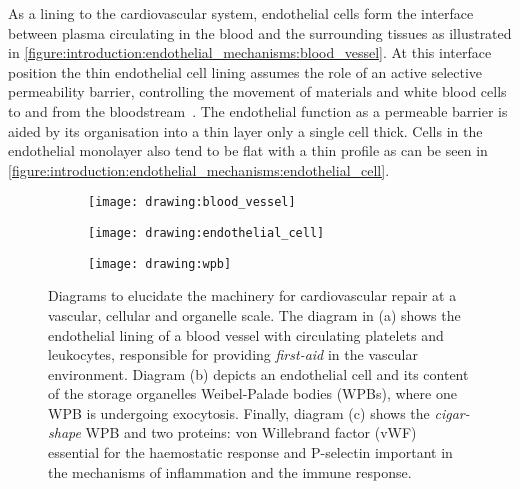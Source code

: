 As a lining to the cardiovascular system, endothelial cells form the interface between plasma circulating in the blood and the surrounding tissues as illustrated in \autoref{figure:introduction:endothelial_mechanisms:blood_vessel}. At this interface position the thin endothelial cell lining assumes the role of an active selective permeability barrier, controlling the movement of materials and white blood cells to and from the bloodstream~\cite{Alberts2002}. The endothelial function as a permeable barrier is aided by its organisation into a thin layer only a single cell thick. Cells in the endothelial  monolayer also tend to be flat with a thin profile as can be seen in \autoref{figure:introduction:endothelial_mechanisms:endothelial_cell}.

\begin{figure}[htbp]\centering
\begin{minipage}{0.49\textwidth}
	\begin{subfigure}[b]{\linewidth}
		\centering
		\texttt{[image: drawing:blood\_vessel]}
		\caption{}
		\label{figure:introduction:endothelial_mechanisms:blood_vessel}
		\vspace{1ex}
	\end{subfigure}
\end{minipage}
\begin{minipage}{0.49\textwidth}
	\begin{subfigure}[b]{\linewidth}
		\centering
		\texttt{[image: drawing:endothelial\_cell]}
		\caption{}
		\label{figure:introduction:endothelial_mechanisms:endothelial_cell}
		\vspace{10.5ex}
	\end{subfigure}
	\begin{subfigure}[b]{\linewidth}
		\centering
		\texttt{[image: drawing:wpb]}
		\caption{}
		\label{figure:introduction:endothelial_mechanisms:wpb}
		\vspace{1ex}
	\end{subfigure}
\end{minipage}
\caption[Endothelial mechanisms for cardiovascular repair at a vascular, cellular and organelle scale]{Diagrams to elucidate the machinery for cardiovascular repair at a vascular, cellular and organelle scale. The diagram in (a) shows the endothelial lining of a blood vessel with circulating platelets and leukocytes, responsible for providing \emph{first-aid} in the vascular environment. Diagram (b) depicts an endothelial cell and its content of the storage organelles Weibel-Palade bodies (WPBs), where one WPB is undergoing exocytosis. Finally, diagram (c) shows the \emph{cigar-shape} WPB and two proteins: von Willebrand factor (vWF) essential for the haemostatic response and P-selectin important in the mechanisms of inflammation and the immune response.}
\label{figure:endothelial_mechanisms}
\end{figure}
